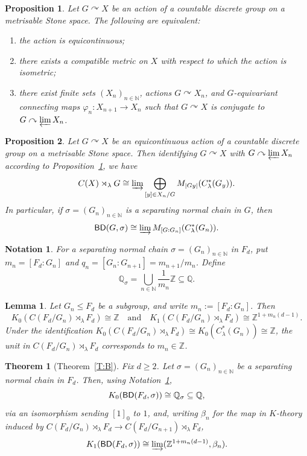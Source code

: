 \documentclass[10pt,a4paper]{amsart}
\newtheorem{prop}{Proposition}
\newtheorem{notation}{Notation}
\newtheorem{lemma}{Lemma}
\newtheorem{thm}{Theorem}
\newcommand{\BD}{{\sf{BD}}}
\newcommand{\Nb}{\mathbb{N}}
\newcommand{\Qb}{\mathbb{Q}}
\newcommand{\Zb}{\mathbb{Z}}
\begin{document}
\begin{prop}\label{P:equi}
    Let $G\curvearrowright X$ be an action of a countable discrete group on a metrisable Stone space. The following are equivalent:
    \begin{enumerate}
        \item the action is equicontinuous;
        \item there exists a compatible metric on $X$ with respect to which the action is isometric;
        \item there exist finite sets $(X_n)_{n\in \Nb}$, actions $G\curvearrowright X_n$, and $G$-equivariant connecting maps $\varphi_n : X_{n+1} \to X_n$ such that $G\curvearrowright X$ is conjugate to $G\curvearrowright \varprojlim X_n$.
    \end{enumerate}
\end{prop}

\begin{prop}\label{P:limit}
    Let $G\curvearrowright X$ be an equicontinuous action of a countable discrete group on a metrisable Stone space. Then identifying $G\curvearrowright X$ with $G\curvearrowright \varprojlim X_n$ according to Proposition~\ref{P:equi}, we have  
    \[
        C(X)\rtimes_\lambda G \cong \varinjlim \bigoplus_{[y]\in X_n/G} M_{|Gy|}(C^*_\lambda(G_y)).
    \]
    In particular, if $\sigma = (G_n)_{n\in\Nb}$ is a separating normal chain in $G$, then 
    \[
        \BD (G,\sigma) \cong \varinjlim M_{[G:G_n]}(C^*_\lambda(G_n)).
    \]    
\end{prop}

\begin{notation}\label{N:chain}
For a separating normal chain $\sigma = (G_n)_{n\in \Nb}$ in $F_d$, put $m_n = [F_d: G_n]$ and $q_n = [G_n : G_{n+1}] = m_{n+1} / m_n$. Define 
\[
    \Qb_\sigma = \bigcup_{n\in \Nb} \frac{1}{m_n}\Zb \subseteq \Qb. 
\]
\end{notation}

\begin{lemma}\label{L:fin_stage}
    Let $G_n \le F_d$ be a subgroup, and write $m_n := [F_d:G_n]$. Then  
    \[
        K_0(C(F_d/G_n)\rtimes_\lambda F_d) \cong \Zb \quad \text{and} \quad K_1(C(F_d/G_n)\rtimes_\lambda F_d) \cong \Zb^{1+m_n(d-1)}.  
    \]
    Under the identification $K_0(C(F_d/G_n)\rtimes_\lambda F_d) \cong K_0(C^*_\lambda(G_n)) \cong \Zb$, the unit in $C(F_d/G_n)\rtimes_\lambda F_d$ corresponds to $m_n \in \Zb$.
\end{lemma}

\begin{thm}[Theorem~\ref{T:B}]\label{T:Kthy}
    Fix $d\ge 2$. Let $\sigma = (G_n)_{n\in\Nb}$ be a separating normal chain in $F_d$. Then, using Notation~\ref{N:chain}, 
    \[
        K_0(\BD(F_d,\sigma)) \cong \Qb_\sigma \subseteq \Qb, 
    \]
    via an isomorphism sending $[1]_0$ to $1$, and, writing $\beta_n$ for the map in $K$-theory induced by $C(F_d/G_n)\rtimes_\lambda F_d \to C(F_d/G_{n+1})\rtimes_\lambda F_d$,
    \[
        K_1(\BD(F_d,\sigma)) \cong \varinjlim (\Zb^{1 + m_n(d-1)},\beta_n).
    \] 
\end{thm}
\end{document}
